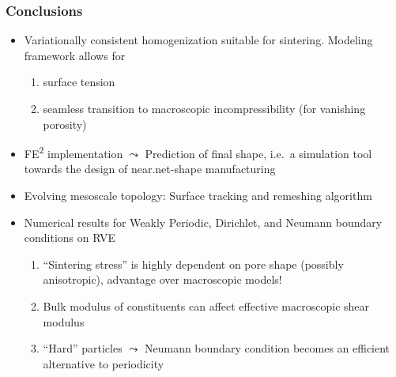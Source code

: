 \documentclass[11pt]{beamer} %
\begin{document}
\begin{frame}
 \frametitle{Conclusions}
 \begin{itemize}
 \item Variationally consistent homogenization suitable for sintering. Modeling framework allows for
  \begin{enumerate}
   \item surface tension
   \item seamless transition to macroscopic incompressibility (for vanishing porosity)
  \end{enumerate}
 \item FE\textsuperscript{2} implementation $\leadsto$ Prediction of final shape, i.e.\ a simulation tool towards the design of near.net-shape manufacturing
 \item Evolving mesoscale topology: Surface tracking and remeshing algorithm
 \item Numerical results for Weakly Periodic, Dirichlet, and Neumann boundary conditions on RVE
  \begin{enumerate}
   \item ``Sintering stress'' is highly dependent on pore shape (possibly anisotropic), advantage over macroscopic models!
   \item Bulk modulus of constituents can affect effective macroscopic shear modulus
   \item ``Hard'' particles $\leadsto$ Neumann boundary condition becomes an efficient alternative to periodicity
  \end{enumerate}
 \end{itemize}
% 
% 
\end{frame}
\end{document}
